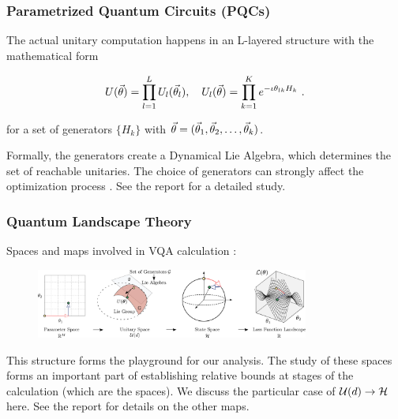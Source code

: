 \begin{frame}
    \frametitle{Parametrized Quantum Circuits (PQCs)}

    The actual unitary computation happens in an L-layered structure with the
    mathematical form

    \begin{gather}
        U(\vec{\theta}) = \prod\limits_{l = 1}^{L} U_l(\vec{\theta}_l), \quad
        U_l(\vec{\theta}) = \prod\limits_{k = 1}^{K} e^{-\iota \theta_{lk} H_k}~.
        \label{eq:pqc}
    \end{gather}

    for a set of generators \(\{H_k\}\) with \(\vec{\theta} = (\vec{\theta}_1,
    \vec{\theta}_2, \ldots, \vec{\theta}_k)\).

    \pause
    Formally, the generators create a Dynamical Lie Algebra, which determines
    the set of reachable unitaries. The choice of generators can strongly affect
    the optimization process \cite{larocca2021diagnosing}. See the report for a
    detailed study.

\end{frame}

\begin{frame}
    \frametitle{Quantum Landscape Theory}

    Spaces and maps involved in VQA calculation \cite{larocca2021theory}:

    \begin{figure}
        \includegraphics[width=0.8\textwidth]{figures/mapsurjective.pdf}
    \end{figure}

    This structure forms the playground for our analysis. The study of these
    spaces forms an important part of establishing relative bounds at stages of
    the calculation (which are the spaces). We discuss the particular case of
    \(\mathcal{U}(d) \to \mathcal{H}\) here. See the report for details on the
    other maps.

\end{frame}
